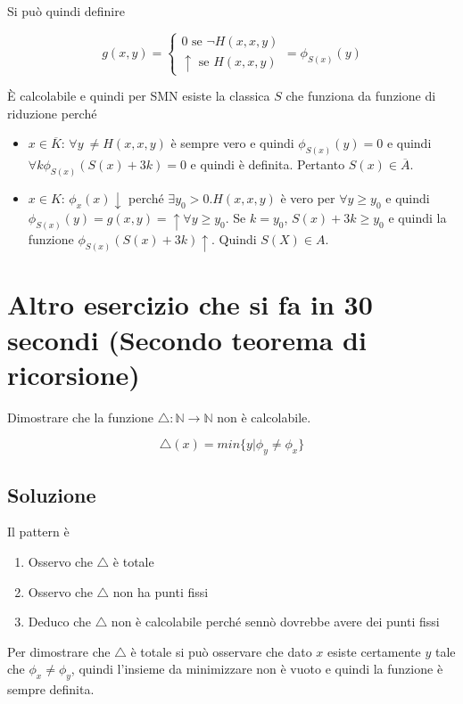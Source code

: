 Si può quindi definire

$$
g(x,y) = \begin{cases}
0 \text{ se } \neg H(x,x,y) \\
\uparrow \text{ se } H(x,x,y)
\end{cases} = \phi_{S(x)}(y)
$$

\`{E} calcolabile e quindi per SMN esiste la classica $S$ che funziona da funzione di riduzione perché

\begin{itemize}
	\item $x \in \overline{K}$: $\forall y \: \neq H(x,x,y)$ è sempre vero e quindi $\phi_{S(x)}(y) = 0$ e quindi $\forall k \phi_{S(x)}(S(x)+3k) = 0$ e quindi è definita. Pertanto $S(x) \in \overline{A}$.
	\item $x \in K$: $\phi_x(x) \downarrow$ perché $\exists y_0 > 0 . H(x,x,y)$ è vero per $\forall y \geq y_0$ e quindi $\phi_{S(x)}(y) = g(x,y) = \uparrow \forall y \geq y_0$. Se $k = y_0$, $S(x) + 3k \geq y_0$ e quindi la funzione $\phi_{S(x)} (S(x) + 3k) \uparrow$. Quindi $S(X) \in A$.
\end{itemize}

\section{Altro esercizio che si fa in 30 secondi (Secondo teorema di ricorsione)}
 
Dimostrare che la funzione $ \bigtriangleup : \mathbb{N} \rightarrow \mathbb{N}$ non è calcolabile.

$$
\bigtriangleup (x) = min \{  y | \phi_y \neq \phi_x \}
$$

\subsection{Soluzione}

Il pattern è 
\begin{enumerate}
	\item Osservo che $\bigtriangleup$ è totale
	\item Osservo che $\bigtriangleup$ non ha punti fissi
	\item Deduco che $\bigtriangleup$ non è calcolabile perché sennò dovrebbe avere dei punti fissi
\end{enumerate}

Per dimostrare che $\bigtriangleup$ è totale si può osservare che dato $x$ esiste certamente $y$ tale che $\phi_x \neq \phi_y$, quindi l'insieme da minimizzare non è vuoto e quindi la funzione è sempre definita.

